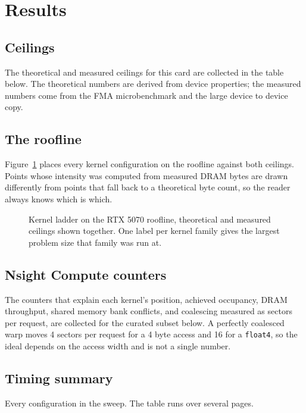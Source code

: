 \section{Results}

\subsection{Ceilings}

The theoretical and measured ceilings for this card are collected in the table
below. The theoretical numbers are derived from device properties; the measured
numbers come from the FMA microbenchmark and the large device to device copy.


\subsection{The roofline}

Figure~\ref{fig:roofline-main} places every kernel configuration on the roofline
against both ceilings. Points whose intensity was computed from measured DRAM
bytes are drawn differently from points that fall back to a theoretical byte
count, so the reader always knows which is which.

\begin{figure}[H]
  \centering
  \caption{Kernel ladder on the RTX 5070 roofline, theoretical and measured
    ceilings shown together. One label per kernel family gives the largest
    problem size that family was run at.}
  \label{fig:roofline-main}
\end{figure}

\subsection{Nsight Compute counters}

The counters that explain each kernel's position, achieved occupancy, DRAM
throughput, shared memory bank conflicts, and coalescing measured as sectors per
request, are collected for the curated subset below. A perfectly coalesced warp
moves 4 sectors per request for a 4 byte access and 16 for a \texttt{float4}, so
the ideal depends on the access width and is not a single number.


\subsection{Timing summary}

Every configuration in the sweep. The table runs over several pages.

